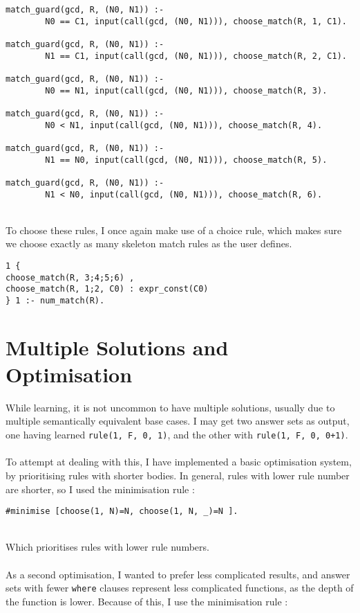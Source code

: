 \begin{lstlisting}
match_guard(gcd, R, (N0, N1)) :- 
		N0 == C1, input(call(gcd, (N0, N1))), choose_match(R, 1, C1).
		
match_guard(gcd, R, (N0, N1)) :- 
		N1 == C1, input(call(gcd, (N0, N1))), choose_match(R, 2, C1).
		
match_guard(gcd, R, (N0, N1)) :- 
		N0 == N1, input(call(gcd, (N0, N1))), choose_match(R, 3).
		
match_guard(gcd, R, (N0, N1)) :- 
		N0 < N1, input(call(gcd, (N0, N1))), choose_match(R, 4).
		
match_guard(gcd, R, (N0, N1)) :- 
		N1 == N0, input(call(gcd, (N0, N1))), choose_match(R, 5).
		
match_guard(gcd, R, (N0, N1)) :- 
		N1 < N0, input(call(gcd, (N0, N1))), choose_match(R, 6).
\end{lstlisting}
\mbox{}\\
To choose these rules, I once again make use of a choice rule, which makes sure we choose exactly as many skeleton match rules as the user defines. \\

\begin{lstlisting}
1 {
choose_match(R, 3;4;5;6) ,
choose_match(R, 1;2, C0) : expr_const(C0)
} 1 :- num_match(R).
\end{lstlisting}

\section{Multiple Solutions and Optimisation}
While learning, it is not uncommon to have multiple solutions, usually due to multiple semantically equivalent base cases. I may get two answer sets as output, one having learned \lstinline{rule(1, F, 0, 1)}, and the other with \lstinline{rule(1, F, 0, 0+1)}. \\ \\
To attempt at dealing with this, I have implemented a basic optimisation system, by prioritising rules with shorter bodies. In general, rules with lower rule number are shorter, so I used the minimisation rule :

\begin{lstlisting}
#minimise [choose(1, N)=N, choose(1, N, _)=N ].
\end{lstlisting}
\mbox{}\\
Which prioritises rules with lower rule numbers.\\ \\
As a second optimisation, I wanted to prefer less complicated results, and answer sets with fewer \lstinline{where} clauses represent less complicated functions, as the depth of the function is lower. Because of this, I use the minimisation rule : \\ %

